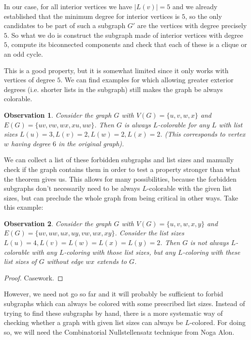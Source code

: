 \documentclass{article}
\newtheorem{observation}{Observation}
\begin{document}
In our case, for all interior vertices we have $|L(v)| = 5$ and we already established that the minimum degree for interior vertices is $5$, so the only candidates to be part of such a subgraph $G'$ are the vertices with degree precisely $5$. So what we do is construct the subgraph made of interior vertices with degree $5$, compute its biconnected components and check that each of these is a clique or an odd cycle. 

This is a good property, but it is somewhat limited since it only works with vertices of degree $5$. We can find examples for which allowing greater exterior degrees (i.e. shorter lists in the subgraph) still makes the graph be always colorable.

\begin{observation}
Consider the graph $G$ with $V(G) = \{u, v, w, x\}$ and $E(G) = \{uv, vw, wx, xu, uw\}$. Then $G$ is always $L$-colorable for any $L$ with list sizes $L(u) = 3, L(v) = 2, L(w) = 2, L(x) = 2$. (This corresponds to vertex $w$ having degree $6$ in the original graph).
\end{observation} 

We can collect a list of these forbidden subgraphs and list sizes and manually check if the graph contains them in order to test a property stronger than what the theorem gives us. This allows for many possibilities, because the forbidden subgraphs don't necessarily need to be always $L$-colorable with the given list sizes, but can preclude the whole graph from being critical in other ways. Take this example:

\begin{observation}
Consider the graph $G$ with $V(G) = \{u, v, w, x, y\}$ and $E(G) = \{uv, uw, ux, uy, vw, wx, xy \}$. Consider the list sizes $L(u) = 4, L(v) = L(w) = L(x) = L(y) = 2$. Then $G$ is not always $L$-colorable with any $L$-coloring with those list sizes, but any $L$-coloring with these list sizes of $G$ without edge $wx$ extends to $G$.
\end{observation}

\begin{proof}
Casework.

\end{proof}

However, we need not go so far and it will probably be sufficient to forbid subgraphs which can always be colored with some prescribed list sizes. Instead of trying to find these subgraphs by hand, there is a more systematic way of checking whether a graph with given list sizes can always be $L$-colored. For doing so, we will need the Combinatorial Nullstellensatz technique from Noga Alon. 
\end{document}

